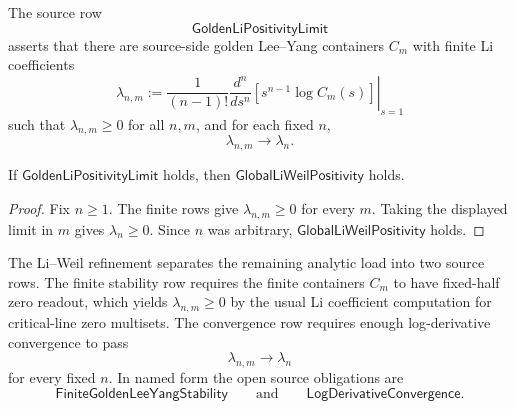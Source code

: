 \begin{definition}
\label{def:rh-golden-li-positivity-limit}
The source row
$$
\mathsf{GoldenLiPositivityLimit}
$$
asserts that there are source-side golden Lee--Yang containers $C_m$
with finite Li coefficients
$$
\lambda_{n,m}
:=
\frac{1}{(n-1)!}
\left.
\frac{d^n}{ds^n}
\left[
s^{n-1}\log C_m(s)
\right]
\right|_{s=1}
$$
such that $\lambda_{n,m}\ge0$ for all $n,m$, and for each fixed $n$,
$$
\lambda_{n,m}\to\lambda_n.
$$
\end{definition}

\begin{theorem}
\label{thm:rh-golden-li-positivity-limit-gives-global-li-positivity}
If $\mathsf{GoldenLiPositivityLimit}$ holds, then
$\mathsf{GlobalLiWeilPositivity}$ holds.
\end{theorem}

\begin{proof}
Fix $n\ge1$.  The finite rows give $\lambda_{n,m}\ge0$ for every $m$.
Taking the displayed limit in $m$ gives $\lambda_n\ge0$.  Since $n$ was
arbitrary, $\mathsf{GlobalLiWeilPositivity}$ holds.
\end{proof}

\begin{principle}
\label{prin:rh-li-route-separates-stability-from-convergence}
The Li--Weil refinement separates the remaining analytic load into two
source rows.  The finite stability row requires the finite containers
$C_m$ to have fixed-half zero readout, which yields
$\lambda_{n,m}\ge0$ by the usual Li coefficient computation for
critical-line zero multisets.  The convergence row requires enough
log-derivative convergence to pass
$$
\lambda_{n,m}\to\lambda_n
$$
for every fixed $n$.  In named form the open source obligations are
$$
\mathsf{FiniteGoldenLeeYangStability}
\qquad
\text{and}
\qquad
\mathsf{LogDerivativeConvergence}.
$$
\end{principle}
